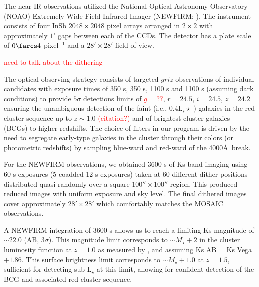 \documentclass[apj, revtex4]{emulateapj}
\newcommand{\editorial}[1]{\textcolor{red}{#1}}
\begin{document}
The near-IR observations utilized the National Optical Astronomy Observatory (NOAO) Extremely Wide-Field Infrared Imager (NEWFIRM; \citealt{Probst2004}). The instrument consists of four InSb $2048 \times 2048$ pixel arrays arranged in $2\times2$ with approximately $1'$ gaps between each of the CCDs. The detector has a plate scale of $0\farcs4$ pixel$^{-1}$ and a $28'\times28'$ field-of-view.

\editorial{need to talk about the dithering}

The optical observing strategy consists of targeted $griz$ observations of individual candidates with exposure times of 350 s, 350 s, 1100 s and 1100 s (assuming dark conditions) to provide $5\sigma$ detections limits of \editorial{$g=??$}, $r = 24.5$, $i = 24.5$, $z = 24.2$ ensuring the unambiguous detection of the faint (i.e., 0.4L$_∗\star$ ) galaxies in the red cluster sequence up to $z \sim 1.0$ \editorial{(citation?)} and of brightest cluster galaxies (BCGs) to higher redshifts. The choice of filters in our program is driven by the need to segregate early-type galaxies in the cluster through their colors (or photometric redshifts) by sampling blue-ward and red-ward of the 4000\AA\ break.

For the NEWFIRM observations, we obtained 3600 s of Ks band imaging using 60 s exposures (5 coadded 12 s exposures) taken at 60 different dither positions distributed quasi-randomly over a square $100''\times100''$ region. This produced reduced images with uniform exposure and sky level. The final dithered images cover approximately $28'\times28'$ which comfortably matches the MOSAIC observations.

A NEWFIRM integration of 3600 s allows us to reach a limiting Ks magnitude of $\sim 22.0$ (AB, $3\sigma$). This magnitude limit corresponds to $\sim M_{\star} + 2$ in the cluster luminosity function at $z = 1.0$ as measured by \cite{DePropris1999a}, and assuming Ks AB = Ks Vega $+ 1.86$. This surface brightness limit corresponds to $\sim M_{\star} + 1.0$ at $z = 1.5$, sufficient for detecting sub L$_{\star}$ at this limit, allowing for confident detection of the BCG and associated red cluster sequence.
\end{document}
